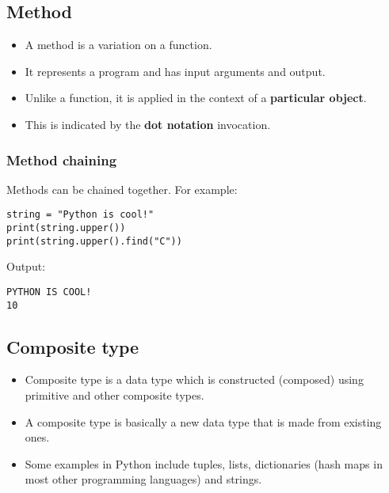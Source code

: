 \documentclass[11pt]{article}
\begin{document}
\subsection{Method}
\label{sec:org6023599}
\begin{itemize}
\item A method is a variation on a function.
\item It represents a program and has input arguments and output.
\item Unlike a function, it is applied in the context of a \textbf{particular object}.
\item This is indicated by the \textbf{dot notation} invocation.
\end{itemize}

\subsubsection{Method chaining}
\label{sec:orgdbff7ca}
Methods can be chained together. For example:
\begin{verbatim}
string = "Python is cool!"
print(string.upper())
print(string.upper().find("C"))
\end{verbatim}

 \noindent Output:

\begin{verbatim}
PYTHON IS COOL!
10
\end{verbatim}

\subsection{Composite type}
\label{sec:org249f6d8}
\begin{itemize}
\item Composite type is a data type which is constructed (composed) using primitive and other composite types.
\item A composite type is basically a new data type that is made from existing ones.
\item Some examples in Python include tuples, lists, dictionaries (hash maps in most other programming languages) and strings.
\end{itemize}
\end{document}
